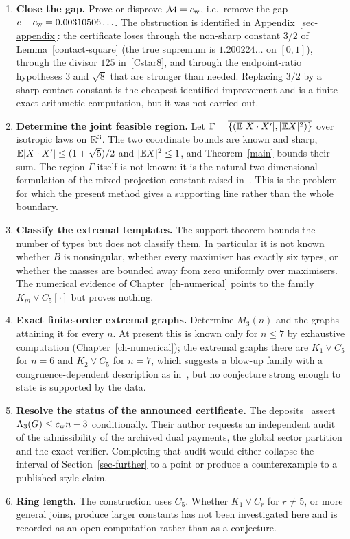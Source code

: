 \begin{enumerate}[leftmargin=2.2em,itemsep=5pt]
\item \textbf{Close the gap.} Prove or disprove $\mathcal M=c_{\mathrm{w}}$, i.e.\
remove the gap $c-c_{\mathrm{w}}=0.00310506\ldots$. The obstruction is identified
in Appendix~\ref{sec-appendix}: the certificate loses through the non-sharp
constant $3/2$ of Lemma~\ref{contact-square} (the true supremum is
$1.200224\ldots$ on $[0,1]$), through the divisor $125$ in~\eqref{Cstar8},
and through the endpoint-ratio hypotheses $3$ and $\sqrt8$ that are stronger
than needed. Replacing $3/2$ by a sharp contact constant is the cheapest
identified improvement and is a finite exact-arithmetic computation, but it
was not carried out.

\item \textbf{Determine the joint feasible region.} Let
$\Gamma=\overline{\{(\mathbb E|X\cdot X'|,|\mathbb E X|^2)\}}$ over isotropic laws on
$\mathbb R^3$. The two coordinate bounds are known and sharp,
$\mathbb E|X\cdot X'|\le(1+\sqrt5)/2$ and $|\mathbb E X|^2\le1$, and Theorem~\ref{main}
bounds their sum.
The region $\Gamma$ itself is not known; it is the natural two-dimensional
formulation of the mixed projection constant raised in~\cite[Section 6.2]{STW}.
This is the problem for which the present method gives a supporting line
rather than the whole boundary.

\item \textbf{Classify the extremal templates.} The support theorem bounds the
number of types but does not classify them. In particular it is not known
whether $B$ is nonsingular, whether every maximiser has exactly six types, or
whether the masses are bounded away from zero uniformly over maximisers. The
numerical evidence of Chapter~\ref{ch-numerical} points to the family
$K_m\vee C_5[\cdot]$ but proves nothing.

\item \textbf{Exact finite-order extremal graphs.} Determine $M_3(n)$ and the
graphs attaining it for every $n$. At present this is known only for $n\le7$
by exhaustive computation (Chapter~\ref{ch-numerical}); the extremal graphs
there are $K_1\vee C_5$ for $n=6$ and $K_2\vee C_5$ for $n=7$, which suggests
a blow-up family with a congruence-dependent description as in~\cite{HW}, but
no conjecture strong enough to state is supported by the data.

\item \textbf{Resolve the status of the announced certificate.} The
deposits~\cite{Newton1,Newton2} assert $\Lambda_3(G)\le c_{\mathrm{w}} n-3$
conditionally. Their author requests an independent audit of the admissibility
of the archived dual payments, the global sector partition and the exact
verifier. Completing that audit would either collapse the interval of
Section~\ref{sec-further} to a point or produce a counterexample to a
published-style claim.

\item \textbf{Ring length.} The construction uses $C_5$. Whether
$K_1\vee C_r$ for $r\ne5$, or more general joins, produce larger constants has
not been investigated here and is recorded as an open computation rather than
as a conjecture.
\end{enumerate}

